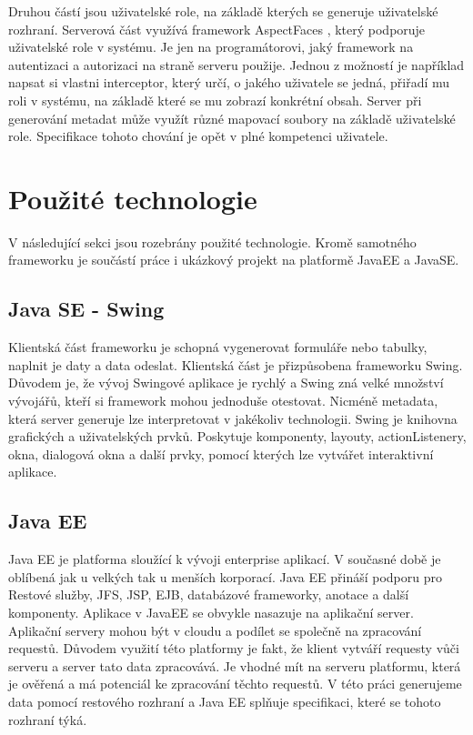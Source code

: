 Druhou částí jsou uživatelské role, na základě kterých se generuje uživatelské rozhraní. Serverová část využívá framework AspectFaces \cite{aspectFaces}, který podporuje uživatelské role v systému. Je jen na programátorovi, jaký framework na autentizaci a autorizaci na straně serveru použije. Jednou z možností je například napsat si vlastni interceptor, který určí, o jakého uživatele se jedná, přiřadí mu roli v systému, na základě které se mu zobrazí konkrétní obsah. Server při generování metadat může využít různé mapovací soubory na základě uživatelské role. Specifikace tohoto chování je opět v plné kompetenci uživatele.
\section{Použité technologie}
V následující sekci jsou rozebrány použité technologie. Kromě samotného frameworku je součástí práce i ukázkový projekt na platformě JavaEE a JavaSE.
\subsection{Java SE - Swing}
Klientská část frameworku je schopná vygenerovat formuláře nebo tabulky, naplnit je daty a data odeslat. Klientská část je přizpůsobena frameworku Swing. Důvodem je, že vývoj Swingové aplikace je rychlý a Swing zná velké množství vývojářů, kteří si framework mohou jednoduše otestovat. Nicméně metadata, která server generuje lze interpretovat v jakékoliv technologii. Swing je knihovna grafických a uživatelských prvků. Poskytuje komponenty, layouty, actionListenery, okna, dialogová okna a další prvky, pomocí kterých lze vytvářet interaktivní aplikace.
\subsection{Java EE}
Java EE je platforma sloužící k vývoji enterprise aplikací. V současné době je oblíbená jak u velkých tak u menších korporací. Java EE přináší podporu pro Restové služby, JFS, JSP, EJB, databázové frameworky, anotace a další komponenty. Aplikace v JavaEE se obvykle nasazuje na aplikační server. Aplikační servery mohou být v cloudu a podílet se společně na zpracování requestů. Důvodem využití této platformy je fakt, že klient vytváří requesty vůči serveru a server tato data zpracovává. Je vhodné mít na serveru platformu, která je ověřená a má potenciál ke zpracování těchto requestů. V této práci generujeme data pomocí restového rozhraní a Java EE splňuje specifikaci, které se tohoto rozhraní týká. 
